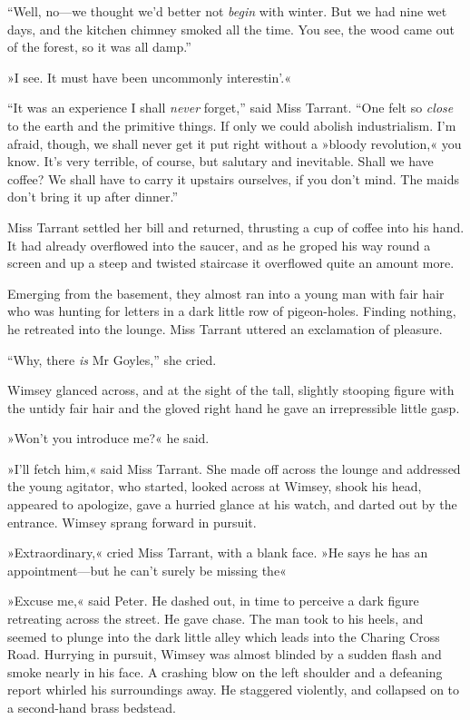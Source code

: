 \enquote{Well, no\allowbreak---\allowbreak we thought we'd better not \textit{begin} with winter. But we had nine wet days, and the kitchen chimney smoked all the time. You see, the wood came out of the forest, so it was all damp.}

»I see. It must have been uncommonly interestin'.«

\enquote{It was an experience I shall \textit{never} forget,} said Miss Tarrant. \enquote{One felt so \textit{close} to the earth and the primitive things. If only we could abolish industrialism. I'm afraid, though, we shall never get it put right without a »bloody revolution,« you know. It's very terrible, of course, but salutary and inevitable. Shall we have coffee? We shall have to carry it upstairs ourselves, if you don't mind. The maids don't bring it up after dinner.}

Miss Tarrant settled her bill and returned, thrusting a cup of coffee into his hand. It had already overflowed into the saucer, and as he groped his way round a screen and up a steep and twisted staircase it overflowed quite an amount more.

Emerging from the basement, they almost ran into a young man with fair hair who was hunting for letters in a dark little row of pigeon-holes.  Finding nothing, he retreated into the lounge. Miss Tarrant uttered an exclamation of pleasure.

\enquote{Why, there \textit{is} Mr Goyles,} she cried.

Wimsey glanced across, and at the sight of the tall, slightly stooping figure with the untidy fair hair and the gloved right hand he gave an irrepressible little gasp.

»Won't you introduce me?« he said.

»I'll fetch him,« said Miss Tarrant. She made off across the lounge and addressed the young agitator, who started, looked across at Wimsey, shook his head, appeared to apologize, gave a hurried glance at his watch, and darted out by the entrance. Wimsey sprang forward in pursuit.

»Extraordinary,« cried Miss Tarrant, with a blank face. »He says he has an appointment\allowbreak---\allowbreak but he can't surely be missing the\longdash«

»Excuse me,« said Peter. He dashed out, in time to perceive a dark figure retreating across the street. He gave chase. The man took to his heels, and seemed to plunge into the dark little alley which leads into the Charing Cross Road. Hurrying in pursuit, Wimsey was almost blinded by a sudden flash and smoke nearly in his face. A crashing blow on the left shoulder and a defeaning report whirled his surroundings away. He staggered violently, and collapsed on to a second-hand brass bedstead.

